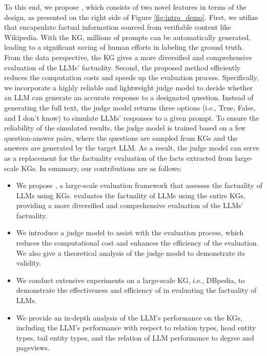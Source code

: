 To this end, we propose \GraphEval{}, which consists of two novel features in terms of the design, as presented on the right side of Figure \ref{fig:intro_demo}. First, we utilize  that encapsulate factual information sourced from verifiable content like Wikipedia. With the KG, millions of prompts can be automatically generated, leading to a significant saving of human efforts in labeling the ground truth. From the data perspective, the KG gives a more diversified and comprehensive evaluation of the LLMs' factuality. Second, the proposed method efficiently reduces the computation costs and speeds up the evaluation process. Specifically, we incorporate a highly reliable and lightweight judge model to decide whether an LLM can generate an accurate response to a designated question. 
Instead of generating the full text, the judge model returns three options (i.e., True, False, and I don't know) to simulate LLMs' responses to a given prompt. To ensure the reliability of the simulated results, the judge model is trained based on a few question-answer pairs, where the questions are sampled from KGs and the answers are generated by the target LLM. As a result, the judge model can serve as a replacement for the factuality evaluation of the facts extracted from large-scale KGs.   In summary, our contributions are as follows:



  

\begin{itemize}[topsep=0pt,itemsep=0pt,parsep=0pt,partopsep=0pt,leftmargin=*]
    \item We propose \GraphEval{}, a large-scale evaluation framework that assesses the factuality of LLMs using KGs. \GraphEval{} evaluates the factuality of LLMs using the entire KGs, providing a more diversified and comprehensive evaluation of the LLMs' factuality.
    \item We introduce a judge model to assist with the evaluation process, which reduces the computational cost and enhances the efficiency of the evaluation. We also give a theoretical analysis of the judge model to demonstrate its validity.
    \item We conduct extensive experiments on a large-scale KG, i.e., DBpedia, to demonstrate the effectiveness and efficiency of \GraphEval{} in evaluating the factuality of LLMs.
    \item We provide an in-depth analysis of the LLM's performance on the KGs, including the LLM's performance with respect to relation types, head entity types, tail entity types, and the relation of LLM performance to degree and pageviews. 
\end{itemize}
     
